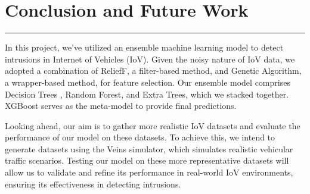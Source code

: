 \chapter{Conclusion and Future Work}
\hrule 
\vspace{0.5cm}
\justifying
 In this project, we've utilized an ensemble machine learning model to detect intrusions in Internet of Vehicles (IoV). Given the noisy nature of IoV data, we adopted a combination of ReliefF, a filter-based method, and Genetic Algorithm, a wrapper-based method, for feature selection. Our ensemble model comprises Decision Trees , Random Forest, and Extra Trees, which we stacked together. XGBoost serves as the meta-model to provide final predictions.

Looking ahead, our aim is to gather more realistic IoV datasets and evaluate the performance of our model on these datasets. To achieve this, we intend to generate datasets using the Veins simulator, which simulates realistic vehicular traffic scenarios. Testing our model on these more representative datasets will allow us to validate and refine its performance in real-world IoV environments, ensuring its effectiveness in detecting intrusions.






